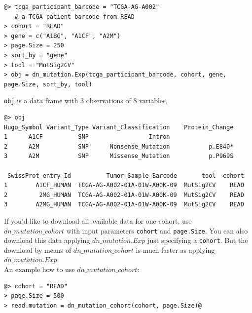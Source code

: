 \documentclass{TechReport}
\begin{document}
\begin{lstlisting}[style=base]
@> tcga_participant_barcode = "TCGA-AG-A002"
   # a TCGA patient barcode from READ
> cohort = "READ"
> gene = c("A1BG", "A1CF", "A2M")
> page.Size = 250
> sort_by = "gene"
> tool = "MutSig2CV"
> obj = dn_mutation.Exp(tcga_participant_barcode, cohort, gene, 
page.Size, sort_by, tool)
\end{lstlisting}
{\tt obj} is a data frame with 3 observations of 8 variables.
\begin{lstlisting}[style=base]
@> obj
Hugo_Symbol Variant_Type Variant_Classification    Protein_Change 
1      A1CF          SNP                 Intron                        
2      A2M           SNP      Nonsense_Mutation           p.E840*         
3      A2M           SNP      Missense_Mutation           p.P969S   

 SwissProt_entry_Id          Tumor_Sample_Barcode       tool  cohort 
1        A1CF_HUMAN  TCGA-AG-A002-01A-01W-A00K-09  MutSig2CV    READ
2         2MG_HUMAN  TCGA-AG-A002-01A-01W-A00K-09  MutSig2CV    READ
3        A2MG_HUMAN  TCGA-AG-A002-01A-01W-A00K-09  MutSig2CV    READ     
\end{lstlisting}
 If you'd like to download all available data for one cohort, use  
$dn\_mutation\_cohort$ with input parameters {\tt cohort} and {\tt page.Size}. 
You can also download this data applying $dn\_mutation.Exp$ just specifying 
a {\tt cohort}. But the download by means of $dn\_mutation\_cohort$ 
is much faster as applying $dn\_mutation.Exp$. \\
An example how to use $dn\_mutation\_cohort$:
\begin{lstlisting}[style=base]
@> cohort = "READ"
> page.Size = 500
> read.mutation = dn_mutation_cohort(cohort, page.Size)@
\end{lstlisting}
\end{document}
